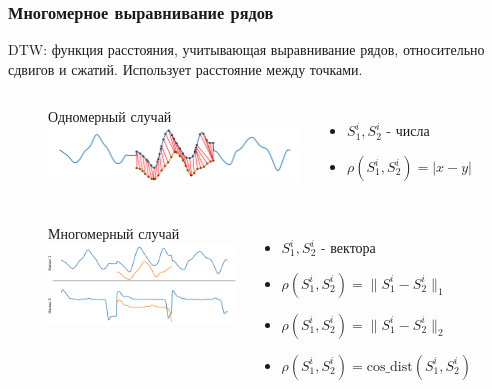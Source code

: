 \documentclass{beamer}
\begin{document}
\begin{frame}
\frametitle{Многомерное выравнивание рядов}
    \begin{block}{}
        DTW: функция расстояния, учитывающая выравнивание рядов, относительно сдвигов и сжатий. Использует расстояние между точками. 
    \end{block}    
    \begin{figure}
        \begin{columns}

               \centering
               Одномерный случай
               \includegraphics[width=\linewidth]{img1.pdf}
            \begin{itemize}
                \item  $S_1^i, S_2^i$ \-- числа
                \item  $\rho(S_1^i, S_2^i) = | x - y |$
            \end{itemize}
        \end{columns} 
        \begin{columns}
                \centering
               Многомерный случай
               \includegraphics[width=\linewidth]{img2.pdf}
            \begin{itemize}
                \item  $S_1^i, S_2^i $ \-- вектора
                \item  $\rho(S_1^i, S_2^i) = \|S_1^i - S_2^i\|_1$
                \item  $\rho(S_1^i, S_2^i) = \|S_1^i - S_2^i\|_2$
                \item  $\rho(S_1^i, S_2^i) = \text{cos\_dist}(S_1^i, S_2^i)$          
            \end{itemize}

        \end{columns} 
    \end{figure}
\end{frame}    
\end{document}

